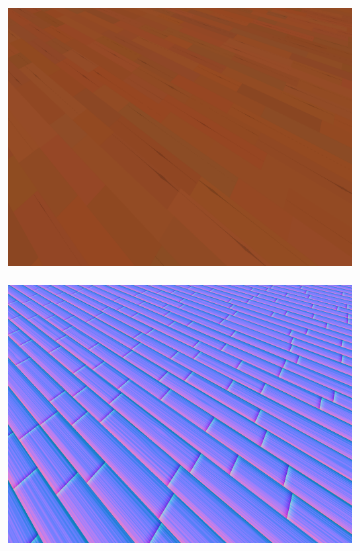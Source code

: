 \documentclass[12pt,a4paper,titlepage,final]{report}
\begin{document}
\begin{figure}[h]
	\centering
	\begin{subfigure}[b]{0.40\textwidth}
		\captionsetup{type=figure}
		\includegraphics[width=\textwidth]{images/drevo-color.png}
		\label{fig:drevo-color}
	\end{subfigure}
	\begin{subfigure}[b]{0.40\textwidth}
		\captionsetup{type=figure}
		\includegraphics[width=\textwidth]{images/drevo-normal.png}
		\label{fig:drevo-normal}
	\end{subfigure}
	

\end{figure}
\end{document}
